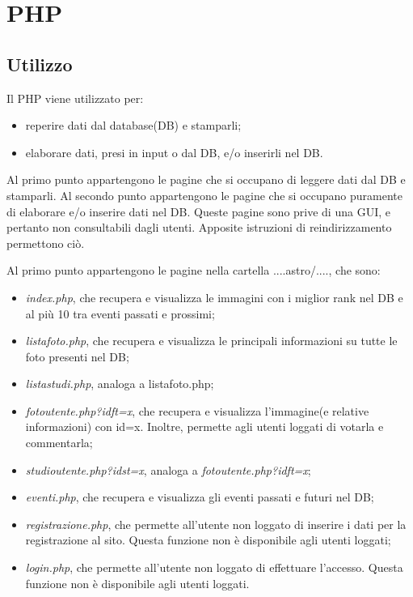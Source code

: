 	\section{PHP}
	\subsection{Utilizzo}
	Il PHP viene utilizzato per:
	\begin{itemize}
	\item reperire dati dal database(DB) e stamparli;
	\item elaborare dati, presi in input o dal DB, e/o inserirli nel DB.
	\end{itemize} 
	
	Al primo punto appartengono le pagine che si occupano di leggere dati dal DB e stamparli.
	Al secondo punto appartengono le pagine che si occupano puramente di elaborare e/o inserire dati nel DB. Queste pagine sono prive di una GUI, e pertanto non consultabili dagli utenti. Apposite istruzioni di reindirizzamento permettono ciò.
	
	Al primo punto appartengono le pagine nella cartella ....astro/...., che sono:
	\begin{itemize}
	\item \textit{index.php}, che recupera e visualizza le immagini con i miglior rank nel DB e al più 10 tra eventi passati e prossimi;
	\item \textit{listafoto.php}, che recupera e visualizza le principali informazioni su tutte le foto presenti nel DB;
	\item \textit{listastudi.php}, analoga a listafoto.php;
	\item \textit{fotoutente.php?idft=x}, che recupera e visualizza l'immagine(e relative informazioni) con id=x. Inoltre, permette agli utenti loggati di votarla e commentarla;
	\item \textit{studioutente.php?idst=x}, analoga a \textit{fotoutente.php?idft=x};
	\item \textit{eventi.php}, che recupera e visualizza gli eventi passati e futuri nel DB;
	\item \textit{registrazione.php}, che permette all'utente non loggato di inserire i dati per la registrazione al sito. Questa funzione non è disponibile agli utenti loggati;
	\item \textit{login.php}, che permette all'utente non loggato di effettuare l'accesso. Questa funzione non è disponibile agli utenti loggati.
	\end{itemize}
	
